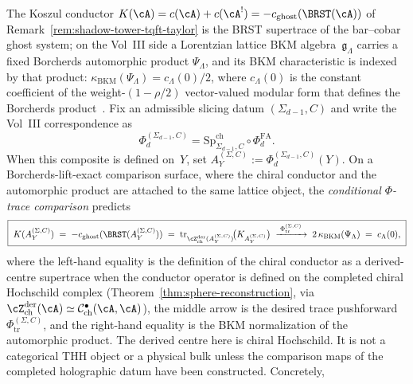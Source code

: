 \begin{remark}
\label{rem:frontier-universal-phi-trace}
\ClaimStatusConjectured
{}
The Koszul conductor
$K(\cA) = c(\cA) + c(\cA^!) = -c_{\mathrm{ghost}}(\BRST(\cA))$
of Remark~\ref{rem:shadow-tower-tqft-taylor} is the BRST
supertrace of the bar--cobar ghost system; on the Vol~III side a
Lorentzian lattice BKM algebra~$\mathfrak g_\Lambda$ carries a fixed
Borcherds automorphic product $\Psi_\Lambda$, and its BKM
characteristic is indexed by that product:
$\kappa_{\mathrm{BKM}}(\Psi_\Lambda) = c_\Lambda(0)/2$, where
$c_\Lambda(0)$ is the constant coefficient of the weight-$(1-\rho/2)$
vector-valued modular form that defines the Borcherds
product~\cite{Borcherds1995,Borcherds92}. Fix an admissible slicing
datum $(\Sigma_{d-1},C)$ and write the Vol~III correspondence as
\[
\Phi_d^{(\Sigma_{d-1},C)}
=
\mathrm{Sp}^{\mathrm{ch}}_{\Sigma_{d-1},C}\circ\Phi_d^{\mathrm{FA}}.
\]
When this composite is defined on~$Y$, set
$A_Y^{(\Sigma,C)}:=\Phi_d^{(\Sigma_{d-1},C)}(Y)$. On a
Borcherds-lift-exact comparison surface, where the chiral conductor
and the automorphic product are attached to the same lattice object,
the \emph{conditional $\Phi$-trace comparison} predicts
\begin{equation}\label{eq:frontier-phi-trace}
\boxed{\;
K(A_Y^{(\Sigma,C)})
\;=\;
-c_{\mathrm{ghost}}(\BRST(A_Y^{(\Sigma,C)}))
\;=\;
\operatorname{tr}_{\cZ^{\mathrm{der}}_{\mathrm{ch}}(A_Y^{(\Sigma,C)})}
 \!\bigl(K_{A_Y^{(\Sigma,C)}}\bigr)
\;\xrightarrow{\;\Phi_{\mathrm{tr}}^{(\Sigma,C)}\;}\;
2\,\kappa_{\mathrm{BKM}}(\Psi_\Lambda)
\;=\;
c_\Lambda(0),
\;}
\end{equation}
where the left-hand equality is the definition of the chiral
conductor as a derived-centre supertrace when the conductor operator
is defined on the completed chiral Hochschild complex
\textup{(}Theorem~\ref{thm:sphere-reconstruction}, via
$\cZ^{\mathrm{der}}_{\mathrm{ch}}(\cA)
\simeq \mathcal C^\bullet_{\mathrm{ch}}(\cA,\cA)$\textup{)}, the
middle arrow is the desired trace pushforward
$\Phi_{\mathrm{tr}}^{(\Sigma,C)}$, and the
right-hand equality is the BKM normalization of the automorphic
product. The derived centre here is chiral Hochschild. It is not a
categorical THH object or a physical bulk unless the comparison maps
of the completed holographic datum have been constructed. Concretely,

\end{remark}
